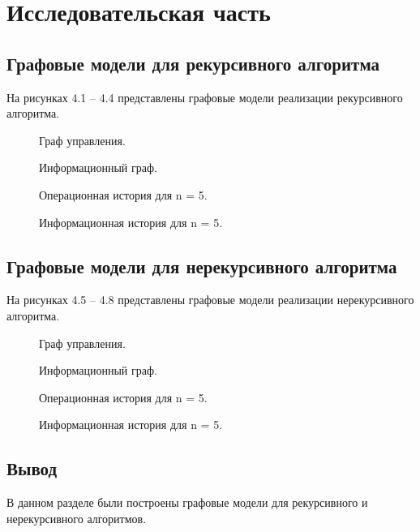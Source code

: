 \chapter{Исследовательская часть}


\section{Графовые модели для рекурсивного алгоритма}

На рисунках 4.1 -- 4.4 представлены графовые модели реализации рекурсивного алгоритма.

\begin{figure}[!htbp]
	\centering
	
	\caption{Граф управления.}
\end{figure}

\begin{figure}[!htbp]
	\centering
	
	\caption{Информационный граф.}
\end{figure}

\begin{figure}[!htbp]
	\centering
	
	\caption{Операционная история для n = 5.}
\end{figure}

\begin{figure}[!htbp]
	\centering
	
	\caption{Информационная история для n = 5.}
\end{figure}

\FloatBarrier

\section{Графовые модели для нерекурсивного алгоритма}

На рисунках 4.5 -- 4.8 представлены графовые модели реализации нерекурсивного алгоритма.

\begin{figure}[!htbp]
	\centering
	
	\caption{Граф управления.}
\end{figure}

\begin{figure}[!htbp]
	\centering
	
	\caption{Информационный граф.}
\end{figure}

\begin{figure}[!htbp]
	\centering
	
	\caption{Операционная история для n = 5.}
\end{figure}

\begin{figure}[!htbp]
	\centering
	
	\caption{Информационная история для n = 5.}
\end{figure}

\FloatBarrier

\section*{Вывод}

В данном разделе были построены графовые модели для рекурсивного и нерекурсивного алгоритмов.

\clearpage
